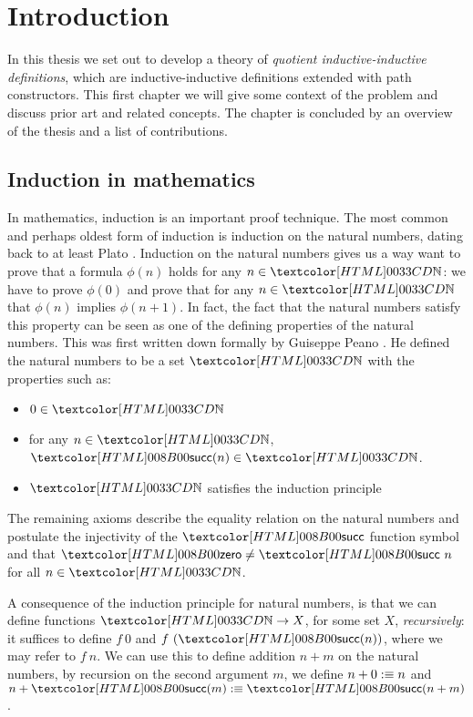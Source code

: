 \chapter{Introduction}
\label{intro}

In this thesis we set out to develop a theory of \emph{quotient
  inductive-inductive definitions}, which are inductive-inductive
definitions \cite{NordvallForsberg2013} extended with path
constructors. This first chapter we will give some context of the
problem and discuss prior art and related concepts. The chapter is
concluded by an overview of the thesis and a list of contributions.

\section{Induction in mathematics}
In mathematics, induction is an important proof technique. The most
common and perhaps oldest form of induction is induction on the
natural numbers, dating back to at least Plato
\cite{Acerbi2000}. Induction on the natural numbers gives us a way
want to prove that a formula $\phi(n)$ holds for any $n \in \natty$:
we have to prove $\phi(0)$ and prove that for any $n \in \natty$ that
$\phi(n)$ implies $\phi(n+1)$. In fact, the fact that the natural
numbers satisfy this property can be seen as one of the defining
properties of the natural numbers. This was first written down
formally by Guiseppe Peano \cite{Peano1889}. He defined the natural
numbers to be a set $\natty$ with the properties such as:
\begin{itemize}
\item $0 \in \natty$
\item for any $n \in \natty$, $\natsucc(n) \in \natty$.
\item $\natty$ satisfies the induction principle
\end{itemize}
The remaining axioms describe the equality relation on the natural
numbers and postulate the injectivity of the $\natsucc$ function
symbol and that $\natzero \neq \natsucc\ n$ for all $n \in \natty$.

A consequence of the induction principle for natural numbers, is that
we can define functions $\natty \to X$, for some set $X$,
\emph{recursively}: it suffices to define $f\ 0$ and
$f\ (\natsucc(n))$, where we may refer to $f\ n$. We can use this to
define addition $n + m$ on the natural numbers, by recursion on the
second argument $m$, \ie we define $n + 0 :\equiv n$ and
$n + \natsucc(m) \ddefeq \natsucc(n+m)$.

